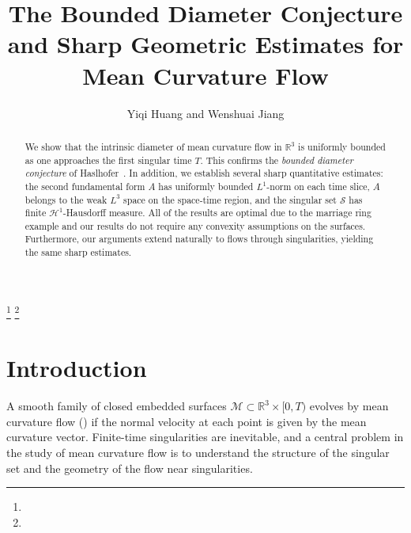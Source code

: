 \documentclass[11pt,reqno]{amsart}
\numberwithin{equation}{section}
\newcommand{\RR}{\mathds{R}}
\newcommand{\cM}{\mathcal{M}}
\theoremstyle{definition}
\theoremstyle{remark}
\theoremstyle{remark}
\theoremstyle{remark}
\theoremstyle{remark}\newtheorem{conjecture}[equation]{Conjecture}
\theoremstyle{remark}\newtheorem{question}[equation]{Question}
\begin{document}
\thanks{}
\thanks{}

\title[]{The Bounded Diameter Conjecture and Sharp Geometric Estimates for Mean Curvature Flow}



\author{Yiqi Huang and Wenshuai Jiang}
\address[Yiqi Huang]{Department of Mathematics, MIT, 77 Massachusetts Avenue, Cambridge, MA 02139-4307, USA}
\address[Wenshuai Jiang]{School of Mathematical Sciences, Zhejiang University, Hangzhou 310058, China; 
School of Mathematics, Institute for Advanced Study, 1 Einstein Drive, Princeton, New Jersey, 08540 USA}



\maketitle

\begin{abstract}

We show that the intrinsic diameter of mean curvature flow in $\mathbb{R}^3$ is uniformly bounded as one approaches the first singular time $T$. This confirms the \emph{bounded diameter conjecture} of Haslhofer~\cite{Has21,Has25}. In addition, we establish several sharp quantitative estimates: the second fundamental form $A$ has uniformly bounded $L^1$-norm on each time slice, $A$ belongs to the weak $L^3$ space on the space-time region, and the singular set $\mathcal{S}$ has finite $\mathcal{H}^1$-Hausdorff measure. All of the results are optimal due to the marriage ring example and our results do not require any convexity assumptions on the surfaces. Furthermore, our arguments extend naturally to flows through singularities, yielding the same sharp estimates.


\end{abstract}






\section{Introduction}






A smooth family of closed embedded surfaces $\cM \subset \RR^3 \times [0,T)$ evolves by mean curvature flow (\cite{Bra78,Hu84}) if the normal velocity at each point is given by the mean curvature vector. Finite-time singularities are inevitable, and a central problem in the study of mean curvature flow is to understand the structure of the singular set and the geometry of the flow near singularities. 
\end{document}
